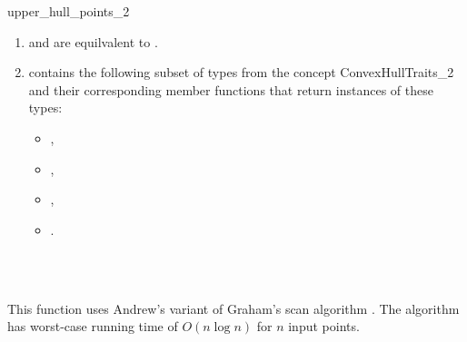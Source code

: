 \begin{ccRefFunction}{upper_hull_points_2}
\begin{enumerate}
   \item    {} and 
            are equilvalent to .
   \item    {} contains the following subset of types from
            the concept ConvexHullTraits\_2 and their corresponding member
            functions that return instances of these types:
            \begin{itemize}
                \item {},
                \item {}, 
                \item {},
                \item {}.
            \end{itemize}
\end{enumerate}

\ccSeeAlso

 \\
 \\

\ccImplementation

This function uses Andrew's
variant of Graham's scan algorithm \cite{a-aeach-79,m-mdscg-84}.  The algorithm
has worst-case running time of  $O(n \log n)$ for $n$ input points.

\end{ccRefFunction}


